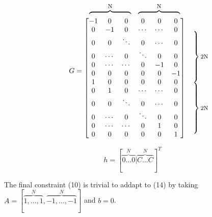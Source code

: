 \documentclass[12pt]{article}
\begin{document}
\[G =
\begin{matrix} %
    \begin{matrix}   %
      \overbrace{\hphantom{\begin{matrix}-1 & \cdots & -1\end{matrix}}}^{\text{\footnotesize N}}
                                  &
      \overbrace{
        \hphantom{\begin{matrix}-1 & \cdots & -1\end{matrix}}
      }^{\text{\footnotesize N}}
    \end{matrix}
    &
  \\
\begin{bmatrix}
 -1 & 0 & 0 & 0 & 0 & 0\\
  0 & -1 & 0 & \cdots & \cdots & 0\\
  0 & 0 & \ddots  & 0 & \cdots & 0\\
  0 & \cdots & 0 & \ddots & 0 & 0\\
  0 & \cdots & \cdots & 0 & -1 & 0\\
  0 & 0 & 0 & 0 & 0 & -1 \\
  1 & 0 & 0 & 0 & 0 & 0\\
  0 & 1 & 0 & \cdots & \cdots & 0\\
  0 & 0 & \ddots  & 0 & \cdots & 0\\
  0 & \cdots & 0 & \ddots & 0 & 0\\
  0 & \cdots & \cdots & 0 & 1 & 0\\
  0 & 0 & 0 & 0 & 0 & 1 \\
\end{bmatrix}
  &
    \begin{matrix}    %
      \vphantom{0} \\ %
        \left.\vphantom{\begin{matrix} 0 \\ 0 \\ 0 \\ 0 \\ 0 \\ 0 \\\end{matrix}}\right\}
      \text{\footnotesize 2N} \\
        \left.\vphantom{\begin{matrix} 0 \\ 0 \\ 0 \\ 0 \\ 0 \\ 0 \end{matrix}}\right\}
      \text{\footnotesize 2N} 
    \end{matrix}
    \mspace{-33mu}
\end{matrix}
\]


\[h = [\overbrace{0 \dots 0}^N|\overbrace{C \dots C}^N]^T\]

The final constraint (10) is trivial to addapt to (14) by taking 
\( A=[\overbrace{1,\dots,1}^N,\overbrace{-1,\dots,-1}^N]\) and \(b=0\).
\end{document}
